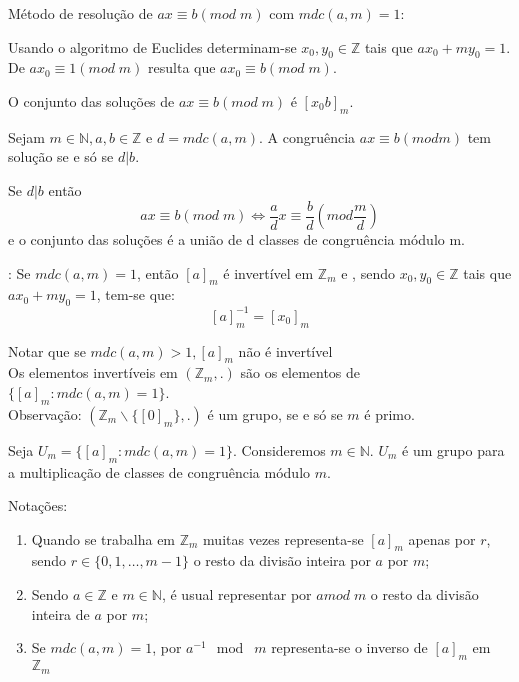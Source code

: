 Método de resolução de $ax \equiv b(mod\;m)$ com $mdc(a,m)=1$:

Usando o algoritmo de Euclides determinam-se $x_0,y_0 \in \mathbb{Z}$ tais que $ax_0+my_0=1$. De $ax_0\equiv1(mod\;m)$ resulta que $ax_0\equiv b(mod\;m)$.

O conjunto das soluções de $ax\equiv b(mod\;m)$ é $[x_0b]_m$.

\begin{proposicao} Sejam $m \in \mathbb{N},a,b\in\mathbb{Z}$ e $d=mdc(a,m)$. A congruência $ax\equiv b(mod m)$ tem solução se e só se $d|b$.
\end{proposicao}

Se $d|b$ então $$ax\equiv b(mod \; m) \Leftrightarrow \frac{a}{d}x\equiv\frac{b}{d}\left(mod\frac{m}{d}\right)$$
e o conjunto das soluções é a união de d classes de congruência módulo m.\\

\begin{proposicao}: Se $mdc(a,m)=1$, então $[a]_m$ é invertível em $\mathbb{Z}_m$ e , sendo $x_0,y_0 \in \mathbb{Z}$ tais que $ax_0+my_0=1$, tem-se que:$$[a]_m^{-1}=[x_0]_m$$
\end{proposicao}

Notar que se $mdc(a,m) > 1, [a]_m$ não é invertível\\
Os elementos invertíveis em $(\mathbb{Z}_m,.)$ são os elementos de $\{[a]_m:mdc(a,m)=1\}$.\\
Observação: $(\mathbb{Z}_m\backslash \{[0]_m\},.)$ é um grupo, se e só se $m$ é primo.\\

\begin{teorema}Seja $U_m=\{[a]_m:mdc(a,m)=1\}$. Consideremos $m \in \mathbb{N}$. $U_m$ é um grupo para a multiplicação de classes de congruência módulo $m$.
\end{teorema}

Notações:
\begin{enumerate}
    \item Quando se trabalha em $\mathbb{Z}_m$ muitas vezes representa-se $[a]_m$ apenas por $r$, sendo \mbox{$r \in \{0,1,\ldots,m-1\}$} o resto da divisão inteira por $a$ por $m$;
    \item Sendo $a \in \mathbb{Z}$ e $m \in \mathbb{N}$, é usual representar por $amod\;m$ o resto da divisão inteira de $a$ por $m$;
    \item Se $mdc(a,m)=1$, por $a^{-1} \mod\;m$ representa-se o inverso de $[a]_m$ em $\mathbb{Z}_m$
\end{enumerate}

